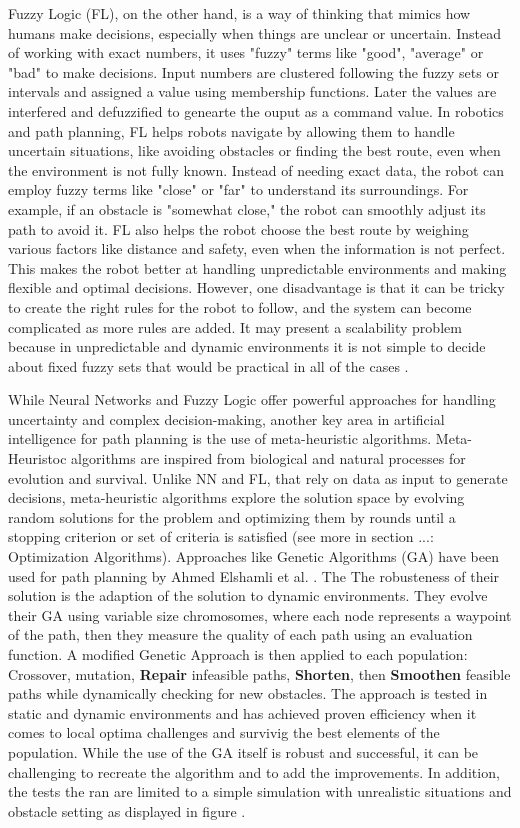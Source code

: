 Fuzzy Logic (FL), on the other hand, is a way of thinking that mimics how humans make decisions, especially when things are unclear 
or uncertain. Instead of working with exact numbers, it uses "fuzzy" terms like "good", "average" or "bad" to make 
decisions. Input numbers are clustered following the fuzzy sets or intervals and assigned a value using membership 
functions. Later the values are interfered and defuzzified to genearte the ouput as a command value. 
In robotics and path planning, FL helps robots navigate by allowing them to handle uncertain situations, 
like avoiding obstacles or finding the best route, even when the environment is not fully known. Instead of needing 
exact data, the robot can employ fuzzy terms like "close" or "far" to understand its surroundings. For example, if an 
obstacle is "somewhat close," the robot can smoothly adjust its path to avoid it. FL also helps the robot choose the best 
route by weighing various factors like distance and safety, even when the information is not perfect. This makes the 
robot better at handling unpredictable environments and making flexible and optimal decisions.
However, one 
disadvantage is that it can be tricky to create the right rules for the robot to follow, and the system can become 
complicated as more rules are added. It may present a scalability problem because in unpredictable and dynamic environments
it is not simple to decide about fixed fuzzy sets that would be practical in all of the cases \cite{R12}.

While Neural Networks and Fuzzy Logic offer powerful approaches for handling uncertainty and complex decision-making, 
another key area in artificial intelligence for path planning is the use of meta-heuristic algorithms.
Meta-Heuristoc algorithms are inspired from biological and natural processes for evolution and survival. 
Unlike NN and FL, that rely on data as input to generate decisions, meta-heuristic algorithms explore the solution
space by evolving random solutions for the problem and optimizing them by rounds until a stopping criterion or set
of criteria is satisfied (see more in section ...: Optimization Algorithms).
Approaches like Genetic Algorithms (GA) have been used for path planning by Ahmed Elshamli et al. \cite{R17}. The The robusteness of their 
solution is the adaption of the solution to dynamic environments. They evolve their GA using variable size chromosomes, where each node 
represents a waypoint of the path, then they measure the quality of each path using an evaluation function. A modified Genetic Approach is then 
applied to each population: Crossover, mutation, \textbf{Repair} infeasible paths, \textbf{Shorten}, then \textbf{Smoothen} 
feasible paths while dynamically checking for new obstacles.
The approach is tested in static and dynamic environments and has achieved proven efficiency when it comes 
to local optima challenges and survivig the best elements of the population. While the use of the GA itself is robust
and successful, it can be challenging to recreate the algorithm and to add the improvements. In addition, the tests
the ran are limited to a simple simulation with unrealistic situations and obstacle setting as displayed in 
figure . 

